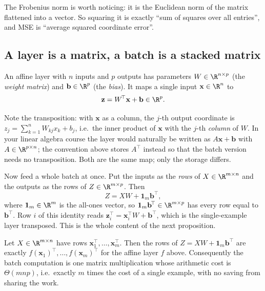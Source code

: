 The Frobenius norm is worth noticing: it is the Euclidean norm of the matrix
flattened into a vector. So squaring it is exactly ``sum of squares over all
entries'', and MSE is ``average squared coordinate error''.

\subsection{A layer is a matrix, a batch is a stacked matrix}

\begin{definition}
An affine layer with $n$ inputs and $p$ outputs has parameters
$W\in\R^{n\times p}$ (the \emph{weight matrix}) and $\mathbf{b}\in\R^{p}$
(the \emph{bias}). It maps a single input $\mathbf{x}\in\R^{n}$ to
\[
  \mathbf{z}=W^{\!\top}\mathbf{x}+\mathbf{b}\in\R^{p}.
\]
\end{definition}

Note the transposition: with $\mathbf{x}$ as a column, the $j$-th output
coordinate is $z_j=\sum_{k=1}^{n}W_{kj}x_k+b_j$, i.e.\ the inner product of
$\mathbf{x}$ with the $j$-th \emph{column} of $W$. In your linear algebra
course the layer would naturally be written as $A\mathbf{x}+\mathbf{b}$ with
$A\in\R^{p\times n}$; the convention above stores $A^{\!\top}$ instead so
that the batch version needs no transposition. Both are the same map; only the
storage differs.

Now feed a whole batch at once. Put the inputs as the \emph{rows} of
$X\in\R^{m\times n}$ and the outputs as the rows of $Z\in\R^{m\times p}$. Then
\[
  Z=XW+\mathbf{1}_m\mathbf{b}^{\!\top},
\]
where $\mathbf{1}_m\in\R^{m}$ is the all-ones vector, so
$\mathbf{1}_m\mathbf{b}^{\!\top}\in\R^{m\times p}$ has every row equal to
$\mathbf{b}^{\!\top}$. Row $i$ of this identity reads
$\mathbf{z}_i^{\!\top}=\mathbf{x}_i^{\!\top}W+\mathbf{b}^{\!\top}$, which is
the single-example layer transposed. This is the whole content of the next
proposition.

\begin{proposition}\label{prop:batching}
Let $X\in\R^{m\times n}$ have rows $\mathbf{x}_1^{\!\top},\ldots,\mathbf{x}_m^{\!\top}$.
Then the rows of $Z=XW+\mathbf{1}_m\mathbf{b}^{\!\top}$ are exactly
$f(\mathbf{x}_1)^{\!\top},\ldots,f(\mathbf{x}_m)^{\!\top}$ for the affine layer
$f$ above. Consequently the batch computation is one matrix multiplication
whose arithmetic cost is $\Theta(mnp)$, i.e.\ exactly $m$ times the cost of a
single example, with no saving from sharing the work.
\end{proposition}

